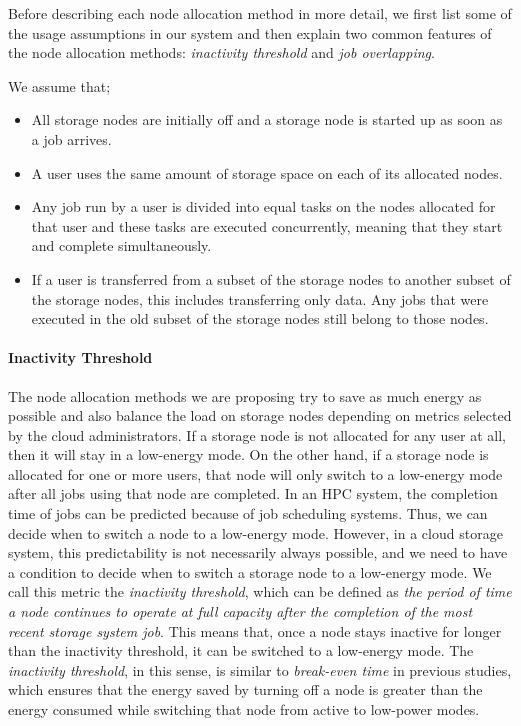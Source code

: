 Before describing each node allocation method in more detail, we first list some of the usage
assumptions in our system and then explain two common
features of the node allocation methods: \textit{inactivity threshold} and \textit{job overlapping}.

We assume that;
\begin{itemize}
\item All storage nodes are initially off and a storage node is started up as soon as a
job arrives.
\item A user uses the same amount of storage space on each of its allocated nodes.
\item Any job run by a user is divided into equal tasks on the nodes allocated for
that user and these tasks are executed concurrently, meaning that they start and
complete simultaneously.
\item If a user is transferred from a subset of the storage nodes to another subset of
the storage nodes, this includes transferring only data. Any jobs that were executed
in the old subset of the storage nodes still belong to those nodes.
\end{itemize}

\paragraph{Inactivity Threshold}
The node allocation methods we are proposing try to save as much energy as possible and
also balance the load on storage nodes depending on metrics selected by the cloud administrators.
If a storage node is not allocated for any user at all, then it will stay in a low-energy mode.
On the other hand, if a storage node is allocated for one or more users, that node will
only switch to a low-energy mode after all jobs using that node are completed.
In an HPC system, the completion time of jobs can be predicted because of job scheduling systems.
Thus, we can decide when to switch a node to a low-energy mode. However, in a cloud storage system,
this predictability is not necessarily always possible, and we need to have a condition to decide when to switch a 
storage node to a low-energy mode. We call this metric the \textit{inactivity threshold}, which
can be defined as \textit{the period of time a node continues to operate at full capacity after the
completion of the most recent storage system job}. This means that, once a node stays inactive for
longer than the inactivity threshold, it can be switched to a
low-energy mode. The \textit{inactivity
threshold}, in this sense, is similar to \textit{break-even time} in previous studies, which ensures
that the energy saved by turning off a node is greater than the energy consumed while switching
that node from active to low-power modes.

